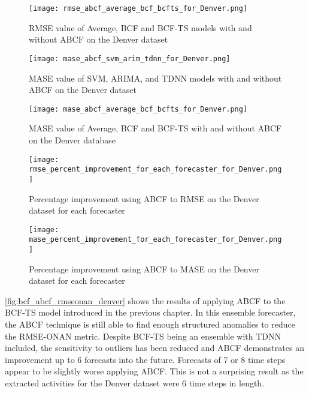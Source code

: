 \begin{figure}[p]
	\begin{center}
		\texttt{[image: rmse\_abcf\_average\_bcf\_bcfts\_for\_Denver.png]}
	\end{center}
	\caption{RMSE value of Average, BCF and BCF-TS models with and without ABCF on the Denver dataset}
	\label{fig:rmse_compare_denver_bcf}
\end{figure}

\begin{figure}[p]
	\begin{center}
		\texttt{[image: mase\_abcf\_svm\_arim\_tdnn\_for\_Denver.png]}
	\end{center}
	\caption{MASE value of SVM, ARIMA, and TDNN models with and without ABCF on the Denver dataset}
	\label{fig:mase_compare_denver_svm}
\end{figure}

\begin{figure}[p]
	\begin{center}
		\texttt{[image: mase\_abcf\_average\_bcf\_bcfts\_for\_Denver.png]}
	\end{center}
	\caption{MASE value of Average, BCF and BCF-TS with and without ABCF on the Denver database}
	\label{fig:mase_compare_denver_bcf}
\end{figure}

\begin{figure}[p]
	\begin{center}
		\texttt{[image: rmse\_percent\_improvement\_for\_each\_forecaster\_for\_Denver.png]}
	\end{center}
	\caption{Percentage improvement using ABCF to RMSE on the Denver dataset for each forecaster}
	\label{fig:rmse_improvement_percent_denver}
\end{figure}

\begin{figure}[p]
	\begin{center}
		\texttt{[image: mase\_percent\_improvement\_for\_each\_forecaster\_for\_Denver.png]}
	\end{center}
	\caption{Percentage improvement using ABCF to MASE on the Denver dataset for each forecaster}
	\label{fig:mase_improvement_percent_denver}
\end{figure}



\ref{fig:bcf_abcf_rmseonan_denver} shows the results of applying ABCF to the BCF-TS model introduced in the previous chapter.  In this ensemble forecaster, the ABCF technique is still able to find enough structured anomalies to reduce the RMSE-ONAN metric.  Despite BCF-TS being an ensemble with TDNN included, the sensitivity to outliers has been reduced and ABCF demonstrates an improvement up to 6 forecasts into the future.  Forecasts of 7 or 8 time steps appear to be slightly worse applying ABCF.  This is not a surprising result as the extracted activities for the Denver dataset were 6 time steps in length.

